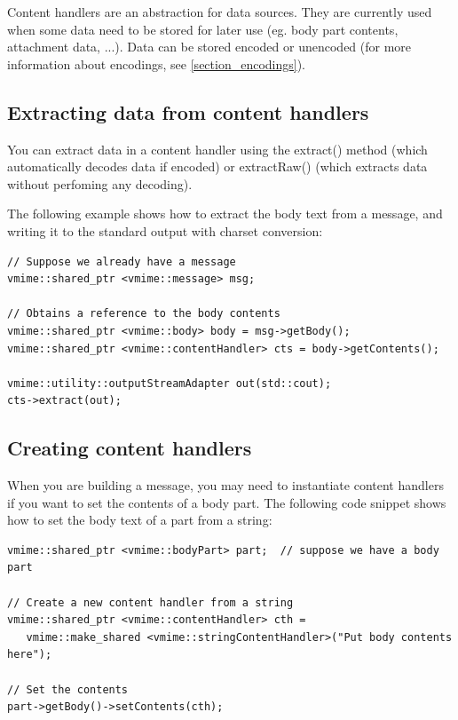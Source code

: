 Content handlers are an abstraction for data sources. They are currently used
when some data need to be stored for later use (eg. body part contents,
attachment data, ...). Data can be stored encoded or unencoded (for more
information about encodings, see \ref{section_encodings}).

\subsection{Extracting data from content handlers} %

You can extract data in a content handler using the {\vcode extract()} method
(which automatically decodes data if encoded) or {\vcode extractRaw()} (which
extracts data without perfoming any decoding).

The following example shows how to extract the body text from a message, and
writing it to the standard output with charset conversion:

\begin{lstlisting}[caption={Using content handlers to extract body text from
a message}]
// Suppose we already have a message
vmime::shared_ptr <vmime::message> msg;

// Obtains a reference to the body contents
vmime::shared_ptr <vmime::body> body = msg->getBody();
vmime::shared_ptr <vmime::contentHandler> cts = body->getContents();

vmime::utility::outputStreamAdapter out(std::cout);
cts->extract(out);
\end{lstlisting}



\subsection{Creating content handlers} %

When you are building a message, you may need to instantiate content handlers
if you want to set the contents of a body part. The following code snippet
shows how to set the body text of a part from a string:

\begin{lstlisting}[caption={Setting the contents of a body part}]
vmime::shared_ptr <vmime::bodyPart> part;  // suppose we have a body part

// Create a new content handler from a string
vmime::shared_ptr <vmime::contentHandler> cth =
   vmime::make_shared <vmime::stringContentHandler>("Put body contents here");

// Set the contents
part->getBody()->setContents(cth);
\end{lstlisting}

